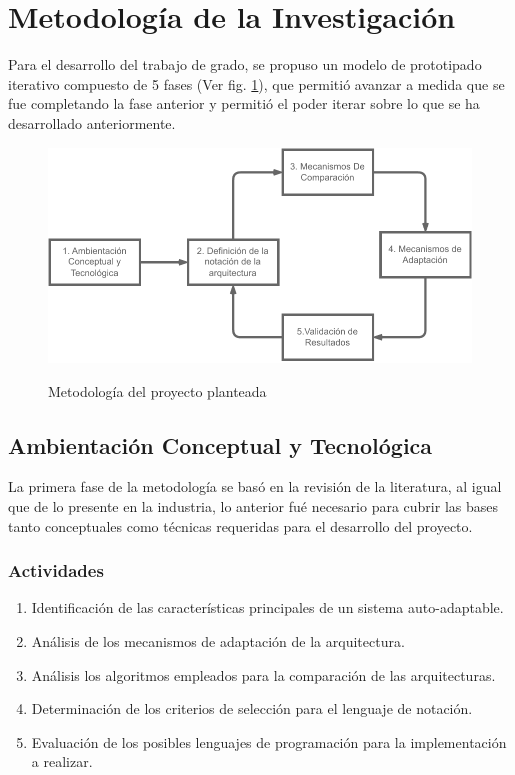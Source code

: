 \section{Metodología de la Investigación}

Para el desarrollo del trabajo de grado, se propuso un modelo de prototipado iterativo compuesto de 5 fases (Ver fig. \ref{fig:met}), que permitió avanzar a medida que se fue completando la fase anterior y permitió el poder iterar sobre lo que se ha desarrollado anteriormente.

\begin{figure}[H]
    \centering
    \caption{Metodología del proyecto planteada}
    \includegraphics[width=0.7\linewidth]{images/Metodologia.pdf}
    \label{fig:met}
\end{figure}

\subsection{Ambientación Conceptual y Tecnológica}

La primera fase de la metodología se basó en la revisión de la literatura, al igual que de lo presente en la industria, lo anterior fué necesario para cubrir las bases tanto conceptuales como técnicas requeridas para el desarrollo del proyecto. 

\subsubsection*{Actividades}

\begin{enumerate}
    \itemsep-2mm
    \item Identificación de las características principales de un sistema auto-adaptable.
    \item Análisis de los mecanismos de adaptación de la arquitectura.
    \item Análisis los algoritmos empleados para la comparación de las arquitecturas.
    \item Determinación de los criterios de selección para el lenguaje de notación.
    \item Evaluación de los posibles lenguajes de programación para la implementación a realizar.
\end{enumerate} 

